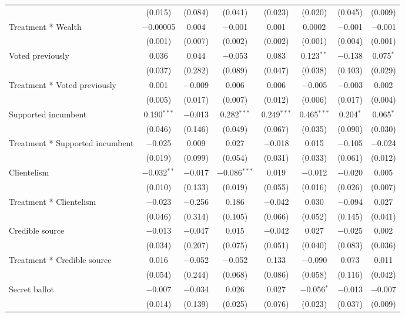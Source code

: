 \documentclass[]{article}
\begin{document}
\begin{table}[!htbp]
\begin{tabular}{@{\extracolsep{1pt}}lccccccc}
  & (0.015) & (0.084) & (0.041) & (0.023) & (0.020) & (0.045) & (0.009) \\ 
  Treatment * Wealth & $-$0.00005 & 0.004 & $-$0.001 & 0.001 & 0.0002 & $-$0.001 & $-$0.001 \\ 
  & (0.001) & (0.007) & (0.002) & (0.002) & (0.001) & (0.004) & (0.001) \\ 
  Voted previously & 0.036 & 0.044 & $-$0.053 & 0.083 & 0.123$^{**}$ & $-$0.138 & 0.075$^{*}$ \\ 
  & (0.037) & (0.282) & (0.089) & (0.047) & (0.038) & (0.103) & (0.029) \\ 
  Treatment * Voted previously & 0.001 & $-$0.009 & 0.006 & 0.006 & $-$0.005 & $-$0.003 & 0.002 \\ 
  & (0.005) & (0.017) & (0.007) & (0.012) & (0.006) & (0.017) & (0.004) \\ 
  Supported incumbent & 0.190$^{***}$ & $-$0.013 & 0.282$^{***}$ & 0.249$^{***}$ & 0.465$^{***}$ & 0.204$^{*}$ & 0.065$^{*}$ \\ 
  & (0.046) & (0.146) & (0.049) & (0.067) & (0.035) & (0.090) & (0.030) \\ 
  Treatment * Supported incumbent & $-$0.025 & 0.009 & 0.027 & $-$0.018 & 0.015 & $-$0.105 & $-$0.024 \\ 
  & (0.019) & (0.099) & (0.054) & (0.031) & (0.033) & (0.061) & (0.012) \\ 
  Clientelism & $-$0.032$^{**}$ & $-$0.017 & $-$0.086$^{***}$ & 0.019 & $-$0.012 & $-$0.020 & 0.005 \\ 
  & (0.010) & (0.133) & (0.019) & (0.055) & (0.016) & (0.026) & (0.007) \\ 
  Treatment * Clientelism & $-$0.023 & $-$0.256 & 0.186 & $-$0.042 & 0.030 & $-$0.094 & 0.027 \\ 
  & (0.046) & (0.314) & (0.105) & (0.066) & (0.052) & (0.145) & (0.041) \\ 
  Credible source & $-$0.013 & $-$0.047 & 0.015 & $-$0.042 & 0.027 & $-$0.025 & 0.002 \\ 
  & (0.034) & (0.207) & (0.075) & (0.051) & (0.040) & (0.083) & (0.036) \\ 
  Treatment * Credible source & 0.016 & $-$0.052 & $-$0.052 & 0.133 & $-$0.090 & 0.073 & 0.011 \\ 
  & (0.054) & (0.244) & (0.068) & (0.086) & (0.058) & (0.116) & (0.042) \\ 
  Secret ballot & $-$0.007 & $-$0.034 & 0.026 & 0.027 & $-$0.056$^{*}$ & $-$0.013 & $-$0.007 \\ 
  & (0.014) & (0.139) & (0.025) & (0.076) & (0.023) & (0.037) & (0.009) \\ 

\end{tabular}
\end{table}
\end{document}
